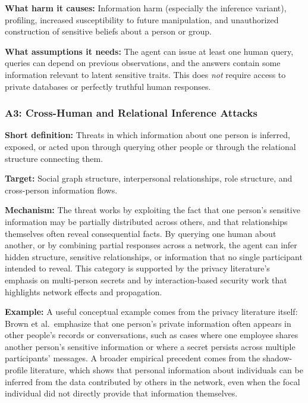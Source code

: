 \documentclass[11pt]{article}
\begin{document}
\textbf{What harm it causes:} Information harm (especially the inference variant), profiling, increased susceptibility to future manipulation, and unauthorized construction of sensitive beliefs about a person or group.

\textbf{What assumptions it needs:} The agent can issue at least one human query, queries can depend on previous observations, and the answers contain some information relevant to latent sensitive traits. This does \emph{not} require access to private databases or perfectly truthful human responses.

\subsubsection{A3: Cross-Human and Relational Inference Attacks}

\textbf{Short definition:} Threats in which information about one person is inferred, exposed, or acted upon through querying other people or through the relational structure connecting them.

\textbf{Target:} Social graph structure, interpersonal relationships, role structure, and cross-person information flows.

\textbf{Mechanism:} The threat works by exploiting the fact that one person's sensitive information may be partially distributed across others, and that relationships themselves often reveal consequential facts. By querying one human about another, or by combining partial responses across a network, the agent can infer hidden structure, sensitive relationships, or information that no single participant intended to reveal. This category is supported by the privacy literature's emphasis on multi-person secrets and by interaction-based security work that highlights network effects and propagation. \citep{brown2022privacylm,schroeder2025multiagentsecurity}

\textbf{Example:} A useful conceptual example comes from the privacy literature itself: Brown et al.\ emphasize that one person's private information often appears in other people's records or conversations, such as cases where one employee shares another person's sensitive information or where a secret persists across multiple participants' messages. A broader empirical precedent comes from the shadow-profile literature, which shows that personal information about individuals can be inferred from the data contributed by others in the network, even when the focal individual did not directly provide that information themselves. \citep{brown2022privacylm,garcia2017shadowprofiles}
\end{document}

